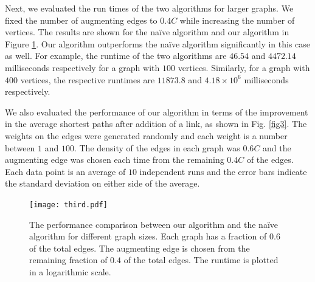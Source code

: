 \documentclass[journal,final,twocolumn,10pt,twoside]{IEEEtranTCOM}
\begin{document}
Next, we evaluated the run times of the two algorithms for larger graphs. We fixed the number of augmenting edges to $0.4C$ while increasing the 
number of vertices. The results are shown for the na\"ive algorithm 
and our algorithm in Figure \ref{fig2}. Our algorithm outperforms 
the na\"ive algorithm significantly in this case as well. For example, the runtime of the two algorithms 
are $46.54$ and $4472.14$ milliseconds respectively for a graph with $100$ vertices. Similarly, for 
a graph with $400$ vertices, the respective runtimes are $11873.8$ and $4.18\times 10^6$ milliseconds 
respectively. 

We also evaluated the performance of our algorithm in terms of the improvement in the average shortest paths after addition of 
a link, as shown in Fig. \ref{fig3}. The weights on the edges were generated randomly and each weight is a number between 
$1$ and $100$. The density of the edges in each graph was $0.6C$ and the augmenting edge was chosen each time from the remaining 
$0.4C$ of the edges. Each data point is an average of $10$ independent runs and the error bars indicate the standard deviation 
on either side of the average. 

\begin{figure}[!t]
\centering
\texttt{[image: third.pdf]}
\vspace{-4cm}
\caption{The performance comparison between our algorithm and the na\"ive algorithm for different
         graph sizes. Each graph has a fraction of $0.6$ of the total edges. The augmenting edge is
         chosen from the remaining fraction of $0.4$ of the total edges. The runtime is plotted
         in a logarithmic scale.}
\label{fig2}
\end{figure}
\end{document}
